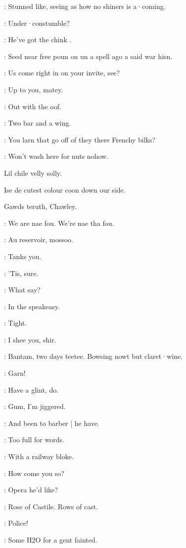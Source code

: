\bannon:
Stunned like,
seeing as how no shiners is a·coming.

\dixon:
Under·constumble?

\mulligan:
He've got the chink .

\crotthers:
Seed near free poun on un a spell ago a said war hisn.

\punch:
Us come right in on your invite,
see?

\bystander:
Up to you,
matey.

\mulligan:
Out with the oof.

\lenehan:
Two bar and a wing.

\dixon:
You larn that go off of they there Frenchy bilks?

\madden:
Won't wash here for nuts nohow.

\begin{omitted}
Lil chile velly solly.

Ise de cutest colour coon down our side.

Gawds teruth,
Chawley.
\end{omitted}

\crotthers:
We are nae fou.
We're nae tha fou.

\dixon:
Au reservoir,
mossoo.

\lynch:
Tanks you.


\lenehan:
'Tis,
sure.

\punch:
What say?

\lynch:
In the speakeasy.

\Bloom:
Tight.

\bannon:
I shee you,
shir.

\lenehan:
Bantam,
two days teetee.
Bowsing nowt but claret·wine.

\punch:
Garn!

\mulligan:
Have a glint,
do.

\madden:
Gum,
I'm jiggered.

\lenehan:
And been to barber |
he have.

\mulligan:
Too full for words.

\punch:
With a railway bloke.

\crotthers:
How come you so?

\dixon:
Opera he'd like?

\madden:
Rose of Castile.
Rows of cast.

\crotthers:
Police!

\stephen:
Some H2O for a gent fainted.

